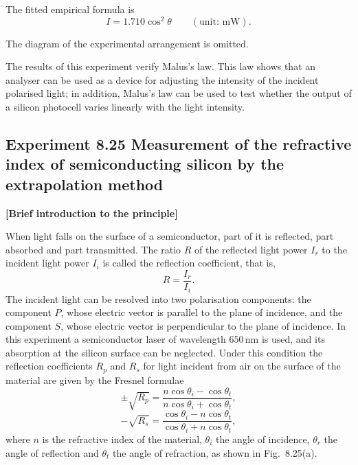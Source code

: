 The fitted empirical formula is
\[
I=1.710\cos^2\theta\qquad(\text{unit: mW}).
\]

The diagram of the experimental arrangement is omitted.

\begin{commentary}
The results of this experiment verify Malus's law. This law shows that an analyser can be used as a device for adjusting the intensity of the incident polarised light; in addition, Malus's law can be used to test whether the output of a silicon photocell varies linearly with the light intensity.
\end{commentary}

\subsection*{Experiment 8.25 \quad Measurement of the refractive index of semiconducting silicon by the extrapolation method}

\textbf{[Brief introduction to the principle]}

When light falls on the surface of a semiconductor, part of it is reflected, part absorbed and part transmitted. The ratio $R$ of the reflected light power $I_r$ to the incident light power $I_i$ is called the reflection coefficient, that is,
\begin{equation}
R=\frac{I_r}{I_i}. \tag{1}
\end{equation}
The incident light can be resolved into two polarisation components: the component $P$, whose electric vector is parallel to the plane of incidence, and the component $S$, whose electric vector is perpendicular to the plane of incidence. In this experiment a semiconductor laser of wavelength $650\,\mathrm{nm}$ is used, and its absorption at the silicon surface can be neglected. Under this condition the reflection coefficients $R_p$ and $R_s$ for light incident from air on the surface of the material are given by the Fresnel formulae
\begin{equation}
\pm\sqrt{R_p}=\frac{n\cos\theta_i-\cos\theta_t}{n\cos\theta_i+\cos\theta_t}, \tag{2}
\end{equation}
\begin{equation}
-\sqrt{R_s}=\frac{\cos\theta_i-n\cos\theta_t}{\cos\theta_i+n\cos\theta_t}, \tag{3}
\end{equation}
where $n$ is the refractive index of the material, $\theta_i$ the angle of incidence, $\theta_r$ the angle of reflection and $\theta_t$ the angle of refraction, as shown in Fig.~8.25(a).

